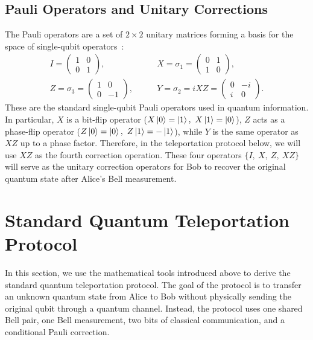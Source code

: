 \documentclass[aps,prd,preprint,floats,epsf,superscriptaddress,nofootinbib]{revtex4}
\begin{document}
\subsection{Pauli Operators and Unitary Corrections}
The Pauli operators are a set of $2\times2$ unitary matrices forming a basis for the space of single-qubit operators~\cite{NielsenChuang2000}:\begin{equation}
\begin{aligned}
I = \left(\begin{array}{cc} 1 & 0 \\ 0 & 1 \end{array}\right),
&\qquad X = \sigma_1=\left(\begin{array}{cc} 0 & 1 \\ 1 & 0 \end{array}\right), \\[10pt]
Z = \sigma_3=\left(\begin{array}{cc} 1 & 0 \\ 0 & -1 \end{array}\right),
&\qquad Y =\sigma_2= iXZ = \left(\begin{array}{cc} 0 & -i \\ i & 0 \end{array}\right).
\end{aligned}
\end{equation}These are the standard single-qubit Pauli operators used in quantum information. In particular, $X$ is a bit-flip operator ($X\ket{0}=\ket{1},\ X\ket{1}=\ket{0}$), $Z$ acts as a phase-flip operator ($Z\ket{0}=\ket{0}, \ Z\ket{1}=-\ket{1}$), while $Y$ is the same operator as $XZ$ up to a phase factor. Therefore, in the teleportation protocol below, we will use $XZ$ as the fourth correction operation. These four operators $\{I,\ X,\ Z,\ XZ\}$ will serve as the unitary correction operators for Bob to recover the original quantum state after Alice's Bell measurement.
\newpage
\section{Standard Quantum Teleportation Protocol}
\label{sec:protocol}
In this section, we use the mathematical tools introduced above to derive the standard quantum teleportation protocol. The goal of the protocol is to transfer an unknown quantum state from Alice to Bob without physically sending the original qubit through a quantum channel. Instead, the protocol uses one shared Bell pair, one Bell measurement, two bits of classical communication, and a conditional Pauli correction.
\end{document}
